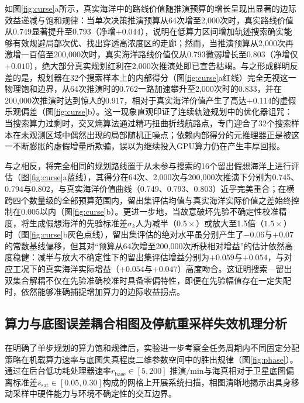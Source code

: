 如图\ref{fig:curse}a所示，真实海洋中的路线价值随推演预算的增长呈现出显著的边际效益递减与饱和规律：当单次决策推演预算从64次增至2,000次时，真实路线价值从0.749显著提升至0.793（净增$+0.044$），说明在低算力区间增加轨迹搜索确实能够有效规避局部次优、找出穿透高浓度区的走廊；然而，当推演预算从2,000次再激增一百倍至200,000次时，真实海洋路线价值仅从0.793微弱增长至0.803（净增仅$+0.010$），绝大部分真实规划红利在2,000次推演处即已宣告枯竭。与之形成鲜明反差的是，规划器在32个搜索样本上的内部得分（图\ref{fig:curse}a红线）完全无视这一物理饱和边界，从64次推演时的0.762一路加速攀升至2,000次时的0.833，并在200,000次推演时达到惊人的0.917，相对于真实海洋价值产生了高达$+0.114$的虚假乐观偏差（图\ref{fig:curse}b）。这一现象直观印证了连续轨迹规划中的优化器诅咒：当搜索算力过剩时，交叉熵算法通过精巧扭曲折线航路点，专门迎合了32个搜索样本在未观测区域中偶然出现的局部随机正噪点；依赖内部得分的元推理器正是被这一不断膨胀的虚假增量所欺骗，误以为继续投入GPU算力仍在产生丰厚回报。

与之相反，将完全相同的规划路线置于从未参与搜索的16个留出假想海洋上进行评估（图\ref{fig:curse}a蓝线），其得分在64次、2,000次与200,000次推演下分别为0.745、0.794与0.802，与真实海洋价值曲线（0.749、0.793、0.803）近乎完美重合；在横跨四个数量级的全部预算范围内，留出集评估均值与真实海洋实际价值之差始终控制在$0.005$以内（图\ref{fig:curse}b）。更进一步地，当故意破坏先验不确定性校准精度，将生成假想海洋的先验标准差$\sigma_k$人为减半（$0.5\times$）或放大至1.5倍（$1.5\times$）时（图\ref{fig:curse}b灰色点线），留出集评估的绝对水平虽分别产生了$-0.06$与$+0.07$的常数基线偏移，但其对“预算从64次增至200,000次所获相对增益”的估计依然高度稳健：减半与放大不确定性下的留出集评估增益分别为$+0.059$与$+0.054$，与对应工况下的真实海洋实际增益（$+0.054$与$+0.047$）高度吻合。这证明搜索—留出双集合解耦不仅在先验准确校准时具备零偏特性，即便在先验幅值存在一定失配时，依然能够准确捕捉增加算力的边际收益拐点。

\subsection{算力与底图误差耦合相图及停航重采样失效机理分析}

在明确了单步规划的算力饱和规律后，实验进一步考察全任务周期内不同固定分配策略在机载算力速率与底图失真程度二维参数空间中的胜出规律（图\ref{fig:phase}）。通过在后台低功耗处理器速率$r_{\text{base}}\in[5, 200]\text{ 推演/min}$与海真相对于卫星底图偏离标准差$s_{\text{sat}}\in[0.05, 0.30]$构成的网格上开展系统扫描，相图清晰地揭示出具身移动采样中硬件能力与环境不确定性的交互边界。

